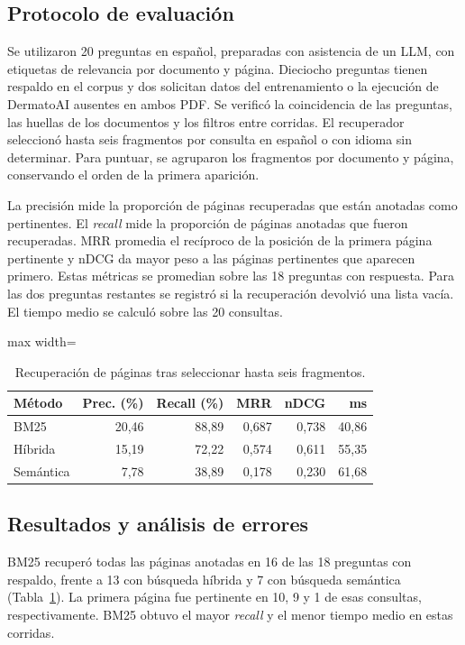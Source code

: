 \subsection{Protocolo de evaluación}
Se utilizaron 20 preguntas en español, preparadas con asistencia de un LLM, con etiquetas de relevancia por documento y página. Dieciocho preguntas tienen respaldo en el corpus y dos solicitan datos del entrenamiento o la ejecución de DermatoAI ausentes en ambos PDF. Se verificó la coincidencia de las preguntas, las huellas de los documentos y los filtros entre corridas. El recuperador seleccionó hasta seis fragmentos por consulta en español o con idioma sin determinar. Para puntuar, se agruparon los fragmentos por documento y página, conservando el orden de la primera aparición.

La precisión mide la proporción de páginas recuperadas que están anotadas como pertinentes. El \emph{recall} mide la proporción de páginas anotadas que fueron recuperadas. MRR promedia el recíproco de la posición de la primera página pertinente y nDCG da mayor peso a las páginas pertinentes que aparecen primero. Estas métricas se promedian sobre las 18 preguntas con respuesta. Para las dos preguntas restantes se registró si la recuperación devolvió una lista vacía. El tiempo medio se calculó sobre las 20 consultas.

\begin{table}[!t]
\centering
\caption{Recuperación de páginas tras seleccionar hasta seis fragmentos.}
\label{tab:rag-resultados}
\small
\begin{adjustbox}{max width=\columnwidth}
\begin{tabular}{lrrrrr}
\toprule
Método & Prec. (\%) & Recall (\%) & MRR & nDCG & ms \\
\midrule
BM25 & 20,46 & 88,89 & 0,687 & 0,738 & 40,86 \\
Híbrida & 15,19 & 72,22 & 0,574 & 0,611 & 55,35 \\
Semántica & 7,78 & 38,89 & 0,178 & 0,230 & 61,68 \\
\bottomrule
\end{tabular}
\end{adjustbox}
\end{table}

\subsection{Resultados y análisis de errores}
BM25 recuperó todas las páginas anotadas en 16 de las 18 preguntas con respaldo, frente a 13 con búsqueda híbrida y 7 con búsqueda semántica (Tabla~\ref{tab:rag-resultados}). La primera página fue pertinente en 10, 9 y 1 de esas consultas, respectivamente. BM25 obtuvo el mayor \emph{recall} y el menor tiempo medio en estas corridas.

